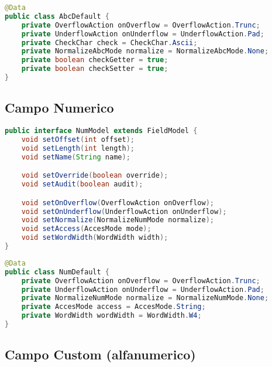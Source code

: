 \documentclass[a4paper,10pt]{report}
\begin{document}
\begin{lstlisting}[language=java, caption=class AbcDefault, 
label=code:AbcDefault]
@Data
public class AbcDefault {
    private OverflowAction onOverflow = OverflowAction.Trunc;
    private UnderflowAction onUnderflow = UnderflowAction.Pad;
    private CheckChar check = CheckChar.Ascii;
    private NormalizeAbcMode normalize = NormalizeAbcMode.None;
    private boolean checkGetter = true;
    private boolean checkSetter = true;
}
\end{lstlisting}


\subsection{Campo Numerico}

\begin{lstlisting}[language=java, caption=interfaccia NumModel, 
label=code:NumModel]
public interface NumModel extends FieldModel {
    void setOffset(int offset);
    void setLength(int length);
    void setName(String name);

    void setOverride(boolean override);
    void setAudit(boolean audit);

    void setOnOverflow(OverflowAction onOverflow);
    void setOnUnderflow(UnderflowAction onUnderflow);
    void setNormalize(NormalizeNumMode normalize);
    void setAccess(AccesMode mode);
    void setWordWidth(WordWidth width);
}
\end{lstlisting}

\begin{lstlisting}[language=java, caption=class NumDefault, 
label=code:NumDefault]
@Data
public class NumDefault {
    private OverflowAction onOverflow = OverflowAction.Trunc;
    private UnderflowAction onUnderflow = UnderflowAction.Pad;
    private NormalizeNumMode normalize = NormalizeNumMode.None;
    private AccesMode access = AccesMode.String;
    private WordWidth wordWidth = WordWidth.W4;
}
\end{lstlisting}


\subsection{Campo Custom (alfanumerico)}
\end{document}
